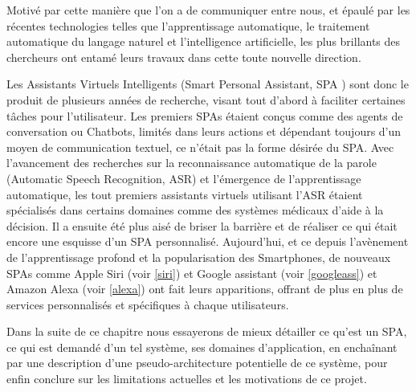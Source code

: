 \par 
Motivé par cette manière que l'on a de communiquer entre nous, et épaulé par les récentes technologies telles que l'apprentissage automatique, le traitement automatique du langage naturel et l'intelligence artificielle, les plus brillants des chercheurs ont entamé leurs travaux dans cette toute nouvelle direction.
\par 
Les Assistants Virtuels Intelligents (Smart Personal Assistant, SPA \cite{SPA-overview}) sont donc le produit de plusieurs années de recherche, visant tout d'abord à faciliter certaines tâches pour l'utilisateur. Les premiers SPAs étaient conçus comme des agents de conversation ou Chatbots, limités dans leurs actions et dépendant toujours d'un moyen de communication textuel, ce n'était pas la forme désirée du SPA. Avec l'avancement des recherches sur la reconnaissance automatique de la parole (Automatic Speech Recognition, ASR) et l'émergence de l'apprentissage automatique, les tout premiers assistants virtuels utilisant l'ASR étaient spécialisés dans certains domaines comme des systèmes médicaux d'aide à la décision. Il a ensuite été plus aisé de briser la barrière et de réaliser ce qui était encore une esquisse d'un SPA personnalisé. Aujourd'hui, et ce depuis l'avènement de l'apprentissage profond et la popularisation des Smartphones, de nouveaux SPAs comme Apple Siri (voir \ref{siri}) et Google assistant (voir \ref{googleass}) et Amazon Alexa (voir \ref{alexa}) ont fait leurs apparitions, offrant de plus en plus de services personnalisés et spécifiques à chaque utilisateurs.
\par 

Dans la suite de ce chapitre nous essayerons de mieux détailler ce qu'est un SPA, ce qui est demandé d'un tel système, ses domaines d'application, en enchaînant par une description d'une pseudo-architecture potentielle de ce système, pour enfin  conclure sur les limitations actuelles et les motivations de ce projet. 

\newpage
